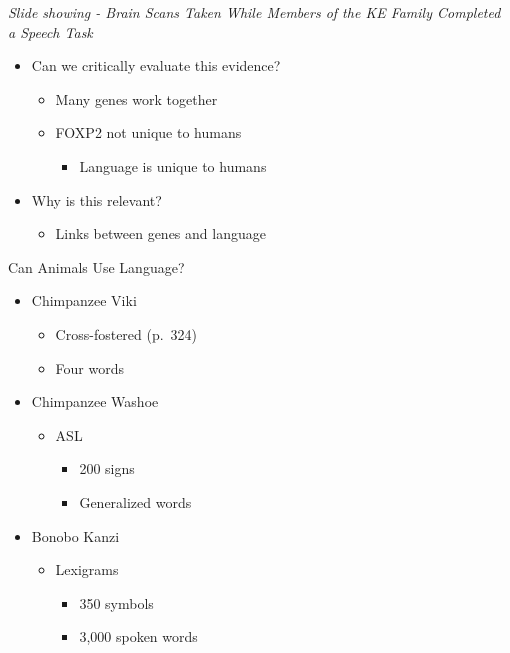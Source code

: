 \documentclass[
]{book}
\providecommand{\tightlist}{%
  \setlength{\itemsep}{0pt}\setlength{\parskip}{0pt}}
\begin{document}
\emph{Slide showing - Brain Scans Taken While Members of the KE Family Completed a Speech Task}

\begin{itemize}
\tightlist
\item
  Can we critically evaluate this evidence?

  \begin{itemize}
  \tightlist
  \item
    Many genes work together\\
  \item
    FOXP2 not unique to humans

    \begin{itemize}
    \tightlist
    \item
      Language is unique to humans
    \end{itemize}
  \end{itemize}
\item
  Why is this relevant?

  \begin{itemize}
  \tightlist
  \item
    Links between genes and language
  \end{itemize}
\end{itemize}

Can Animals Use Language?

\begin{itemize}
\tightlist
\item
  Chimpanzee Viki

  \begin{itemize}
  \tightlist
  \item
    Cross-fostered (p.~324)\\
  \item
    Four words
  \end{itemize}
\item
  Chimpanzee Washoe

  \begin{itemize}
  \tightlist
  \item
    ASL

    \begin{itemize}
    \tightlist
    \item
      200 signs\\
    \item
      Generalized words
    \end{itemize}
  \end{itemize}
\item
  Bonobo Kanzi

  \begin{itemize}
  \tightlist
  \item
    Lexigrams

    \begin{itemize}
    \tightlist
    \item
      350 symbols\\
    \item
      3,000 spoken words
    \end{itemize}
  \end{itemize}
\end{itemize}
\end{document}

